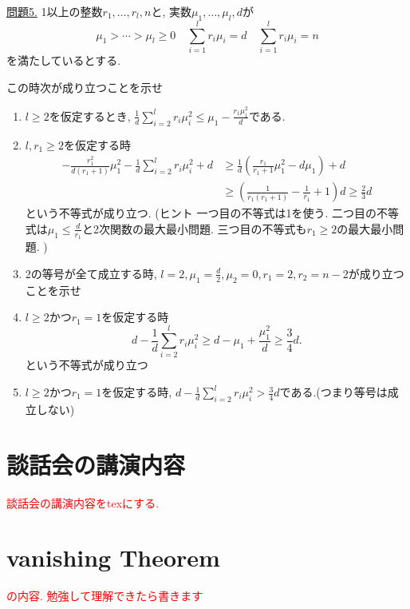 \documentclass[dvipdfmx,a4paper,11pt]{article} %
\theoremstyle{definition}
\theoremstyle{remark}
\numberwithin{equation}{section}
\newcommand{\xr}[1]{\textcolor{red}{#1}}
\begin{document}
\underline{問題5.} 
1以上の整数$r_1, \ldots, r_l, n$と, 実数$\mu_1, \ldots, \mu_l, d$が
\[
\mu_1 > \cdots > \mu_l \geq 0
\quad
\sum_{i=1}^{l}r_i\mu_i=d
\quad 
\sum_{i=1}^{l}r_i\mu_i=n
\]
を満たしているとする. 

この時次が成り立つことを示せ
\begin{enumerate}
\item  $l\ge 2$を仮定するとき, $\frac{1}{d} \sum_{i=2}^{l}r_i \mu_i^2 \le \mu_1 - \frac{r_1 \mu_1^{2}}{d}$である.
\item $l, r_1\ge 2$を仮定する時
\begin{align*}
-\frac{r_1^2}{d(r_1+1)}\mu_1^2
-\frac{1}{d} \sum_{i=2}^{l}r_i \mu_i^2
+d
&\ge
\frac{1}{d}\left(
\frac{r_1}{r_1+1}\mu_1^2
-
d\mu_1
\right)
+d
\\
&\ge
\left(
\frac{1}{r_1(r_1+1)}-\frac{1}{r_1}+1
\right)d
\ge \frac{2}{3}d
\end{align*}
という不等式が成り立つ. (ヒント 一つ目の不等式は1を使う. 二つ目の不等式は$\mu_1 \le \frac{d}{r_1}$と2次関数の最大最小問題. 三つ目の不等式も$r_1 \ge 2$の最大最小問題. )
\item 2の等号が全て成立する時, $l=2,\mu_1=\frac{d}{2}, \mu_2=0,r_1=2,r_2=n-2$が成り立つことを示せ
\item $l\ge 2$かつ$r_1=1$を仮定する時
$$
d
-
\frac{1}{d} \sum_{i=2}^{l}r_i \mu_i^2 
\geq
d-\mu_1+\frac{\mu_1^2}{d} \geq
\frac{3}{4}d .
$$
という不等式が成り立つ
\item $l\ge 2$かつ$r_1=1$を仮定する時, $d-\frac{1}{d} \sum_{i=2}^{l}r_i \mu_i^2 >\frac{3}{4}d $である.(つまり等号は成立しない) 
\end{enumerate}

\newpage
\section{談話会の講演内容}
\xr{談話会の講演内容をtexにする. }

\section{vanishing Theorem}
\xr{\cite[3章]{Kob14}の内容. 勉強して理解できたら書きます} 
\end{document}
